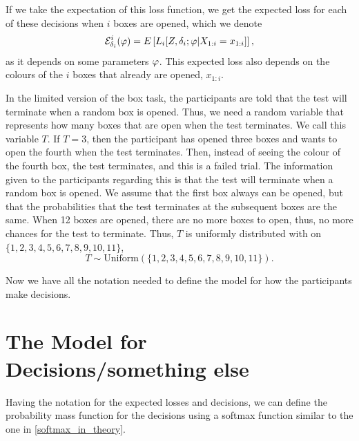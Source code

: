 If we take the expectation of this loss function, we get the expected loss for each of these decisions when $i$ boxes are opened, which we denote
\begin{equation*}
    \mathcal{E}^i_{\delta_i}(\varphi) = E\left[ L_i[Z,\delta_i;\varphi|X_{1:i}=x_{1:i}]\right],
\end{equation*}
as it depends on some parameters $\varphi$. This expected loss also depends on the colours of the $i$ boxes that already are opened, $x_{1:i}$.

In the limited version of the box task, the participants are told that the test will terminate when a random box is opened. Thus, we need a random variable that represents how many boxes that are open when the test terminates. We call this variable $T$. If $T=3$, then the participant has opened three boxes and wants to open the fourth when the test terminates. Then, instead of seeing the colour of the fourth box, the test terminates, and this is a failed trial. The information given to the participants regarding this is that the test will terminate when a random box is opened. We assume that the first box always can be opened, but that the probabilities that the test terminates at the subsequent boxes are the same. When 12 boxes are opened, there are no more boxes to open, thus, no more chances for the test to terminate. Thus, $T$ is uniformly distributed with on $\{1,2,3,4,5,6,7,8,9,10,11\}$, 
\begin{equation}
\label{T_uniform}
    T \sim \text{Uniform}(\{1,2,3,4,5,6,7,8,9,10,11\}).
\end{equation}

Now we have all the notation needed to define the model for how the participants make decisions. 

\section{The Model for Decisions/something else}
Having the notation for the expected losses and decisions, we can define the probability mass function for the decisions using a softmax function similar to the one in \eqref{softmax_in_theory}. 

